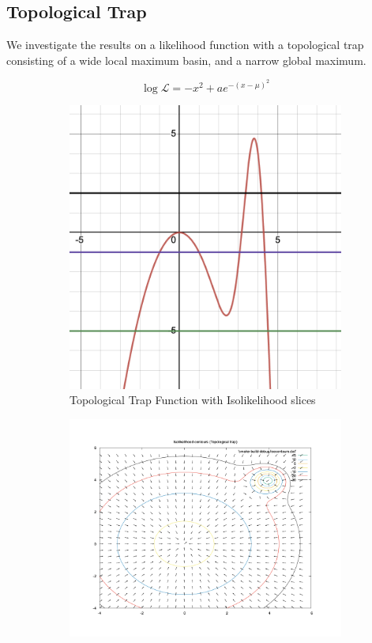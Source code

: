 \documentclass[11pt]{article}
\begin{document}
    \subsection{Topological Trap}
    We investigate the results on a likelihood function with a topological trap
    consisting of a wide local maximum basin, and a narrow global maximum.

    \[
        \log \mathcal{L} = -x^2 + a e^{-(x-\mu)^2}
    \]

    \begin{figure}[H]
        \centering
        \begin{subfigure}[b]{0.35\linewidth}
            \centering
            \includegraphics[width=\linewidth]{../figures/topotrap/function}
            \caption{Topological Trap Function with Isolikelihood slices}
        \end{subfigure}
        \begin{subfigure}[b]{0.55\linewidth}
            \centering
            \includegraphics[width=\linewidth]{../figures/topotrap/contour}

\end{subfigure}
\end{figure}
\end{document}
